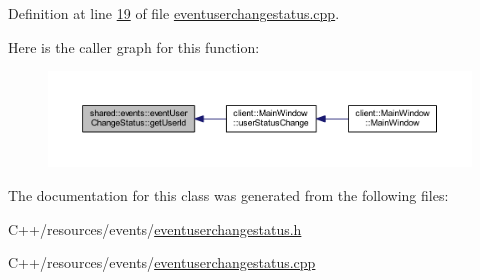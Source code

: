 Definition at line \hyperlink{eventuserchangestatus_8cpp_source_l00019}{19} of file \hyperlink{eventuserchangestatus_8cpp_source}{eventuserchangestatus.\-cpp}.



Here is the caller graph for this function\-:
\nopagebreak
\begin{figure}[H]
\begin{center}
\leavevmode
\includegraphics[width=350pt]{d3/dcc/classshared_1_1events_1_1event_user_change_status_a4c904f38f1ff994ebb9a9ec251604874_icgraph}
\end{center}
\end{figure}




The documentation for this class was generated from the following files\-:\begin{DoxyCompactItemize}
\item 
C++/resources/events/\hyperlink{eventuserchangestatus_8h}{eventuserchangestatus.\-h}\item 
C++/resources/events/\hyperlink{eventuserchangestatus_8cpp}{eventuserchangestatus.\-cpp}\end{DoxyCompactItemize}
